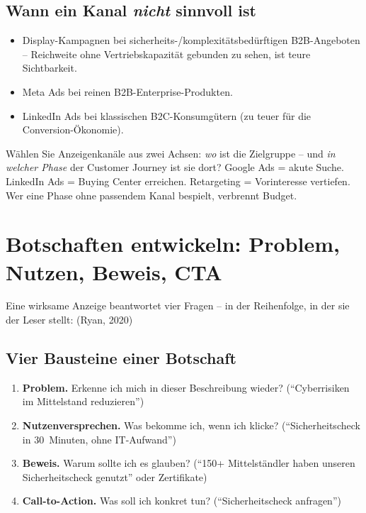 \documentclass[11pt,a4paper,oneside]{article}
\newcommand{\fachbegriff}[1]{\textbf{#1}}
\newcommand{\quelle}[1]{{\footnotesize\color{lpGray}(#1)}}
\begin{document}
\subsection{Wann ein Kanal \emph{nicht} sinnvoll ist}

\begin{itemize}
  \item Display-Kampagnen bei sicherheits-/komplexitätsbedürftigen B2B-Angeboten -- Reichweite ohne Vertriebskapazität gebunden zu sehen, ist teure Sichtbarkeit.
  \item Meta Ads bei reinen B2B-Enterprise-Produkten.
  \item LinkedIn Ads bei klassischen B2C-Konsumgütern (zu teuer für die Conversion-Ökonomie).
\end{itemize}

\begin{merkbox}
Wählen Sie Anzeigenkanäle aus zwei Achsen: \emph{wo} ist die Zielgruppe -- und \emph{in welcher Phase} der Customer Journey ist sie dort? Google Ads = akute Suche. LinkedIn Ads = Buying Center erreichen. Retargeting = Vorinteresse vertiefen. Wer eine Phase ohne passendem Kanal bespielt, verbrennt Budget.
\end{merkbox}

\section{Botschaften entwickeln: Problem, Nutzen, Beweis, CTA}

Eine wirksame Anzeige beantwortet vier Fragen -- in der Reihenfolge, in der sie der Leser stellt: \quelle{Ryan, 2020}

\subsection{Vier Bausteine einer Botschaft}

\begin{enumerate}
  \item \fachbegriff{Problem.} Erkenne ich mich in dieser Beschreibung wieder? (``Cyberrisiken im Mittelstand reduzieren'')
  \item \fachbegriff{Nutzenversprechen.} Was bekomme ich, wenn ich klicke? (``Sicherheitscheck in 30~Minuten, ohne IT-Aufwand'')
  \item \fachbegriff{Beweis.} Warum sollte ich es glauben? (``150+ Mittelständler haben unseren Sicherheitscheck genutzt'' oder Zertifikate)
  \item \fachbegriff{Call-to-Action.} Was soll ich konkret tun? (``Sicherheitscheck anfragen'')
\end{enumerate}
\end{document}
